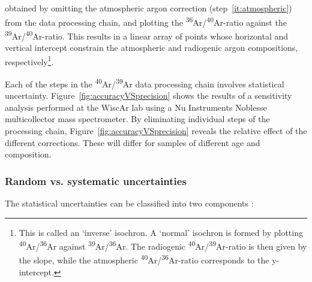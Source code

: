 \documentclass{article}
\begin{document}
\begin{enumerate}
  obtained by omitting the atmospheric argon correction
  (step~\ref{it:atmospheric}) from the data processing chain, and
  plotting the \textsuperscript{36}Ar/\textsuperscript{40}Ar-ratio
  against the
  \textsuperscript{39}Ar/\textsuperscript{40}Ar-ratio. This results in
  a linear array of points whose horizontal and vertical intercept
  constrain the atmospheric and radiogenic argon compositions,
  respectively\footnote{This is called an `inverse' isochron. A
    `normal' isochron is formed by plotting
    \textsuperscript{40}Ar/\textsuperscript{36}Ar against
    \textsuperscript{39}Ar/\textsuperscript{36}Ar. The radiogenic
    \textsuperscript{40}Ar/\textsuperscript{39}Ar-ratio is then given
    by the slope, while the atmospheric
    \textsuperscript{40}Ar/\textsuperscript{36}Ar-ratio corresponds to
    the y-intercept.}.
\end{enumerate}

Each of the steps in the \textsuperscript{40}Ar/\textsuperscript{39}Ar
data processing chain involves statistical uncertainty.
Figure~\ref{fig:accuracyVSprecision} shows the results of a
sensitivity analysis performed at the WiscAr lab using a Nu
Instruments Noblesse multicollector mass spectrometer.  By eliminating
individual steps of the processing chain,
Figure~\ref{fig:accuracyVSprecision} reveals the relative effect of
the different corrections. These will differ for samples of different
age and composition.

\subsubsection{Random vs. systematic uncertainties}
\label{sec:randomVSsystematic}

The statistical uncertainties can be classified into two components
\citep{renne1998}:
\end{document}
